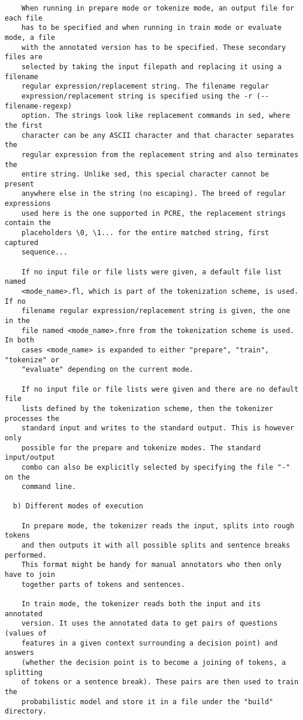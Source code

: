 \begin{small}
\begin{verbatim}
    When running in prepare mode or tokenize mode, an output file for each file
    has to be specified and when running in train mode or evaluate mode, a file
    with the annotated version has to be specified. These secondary files are
    selected by taking the input filepath and replacing it using a filename
    regular expression/replacement string. The filename regular
    expression/replacement string is specified using the -r (--filename-regexp)
    option. The strings look like replacement commands in sed, where the first
    character can be any ASCII character and that character separates the
    regular expression from the replacement string and also terminates the
    entire string. Unlike sed, this special character cannot be present
    anywhere else in the string (no escaping). The breed of regular expressions
    used here is the one supported in PCRE, the replacement strings contain the
    placeholders \0, \1... for the entire matched string, first captured
    sequence...

    If no input file or file lists were given, a default file list named
    <mode_name>.fl, which is part of the tokenization scheme, is used. If no
    filename regular expression/replacement string is given, the one in the
    file named <mode_name>.fnre from the tokenization scheme is used. In both
    cases <mode_name> is expanded to either "prepare", "train", "tokenize" or
    "evaluate" depending on the current mode.

    If no input file or file lists were given and there are no default file
    lists defined by the tokenization scheme, then the tokenizer processes the
    standard input and writes to the standard output. This is however only
    possible for the prepare and tokenize modes. The standard input/output
    combo can also be explicitly selected by specifying the file "-" on the
    command line.

  b) Different modes of execution

    In prepare mode, the tokenizer reads the input, splits into rough tokens
    and then outputs it with all possible splits and sentence breaks performed.
    This format might be handy for manual annotators who then only have to join
    together parts of tokens and sentences.

    In train mode, the tokenizer reads both the input and its annotated
    version. It uses the annotated data to get pairs of questions (values of
    features in a given context surrounding a decision point) and answers
    (whether the decision point is to become a joining of tokens, a splitting
    of tokens or a sentence break). These pairs are then used to train the
    probabilistic model and store it in a file under the "build" directory.


\end{verbatim}
\end{small}
